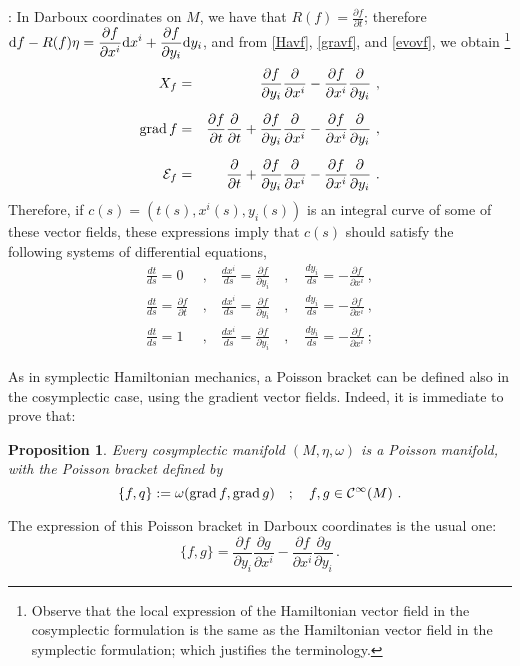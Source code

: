 \documentclass[12pt]{report}
\newtheorem{prop}[teor]{Proposition}
\def\beq{\begin{equation}}
\def\eeq{\end{equation}}
\def\bea{\begin{eqnarray}}
\def\eea{\end{eqnarray}}
\def\dst{\displaystyle}
\def\derpar#1#2{\frac{\partial{#1}}{\partial{#2}}}
\def\d{{\rm d}}
\begin{document}
:
In Darboux coordinates on $M$, we have that $\dst R(f)=\derpar{f}{t}$; therefore
$\dst \d f- R(f)\eta=\derpar{f}{x^i}\d x^i+\derpar{f}{y_i}\d y_i$, and from \eqref{Havf}, \eqref{gravf}, and \eqref{evovf},
we obtain
\footnote{
 Observe that the local expression of the Hamiltonian vector field in the cosymplectic formulation is the same as the Hamiltonian vector field in the symplectic formulation;
which justifies the terminology.}
\bea
    X_f &=& \frac{\partial f}{\partial y_ i}\frac{\partial}{\partial x^i}- \frac{\partial f}{\partial x^i}\frac{\partial}{\partial y_i}\ , \nonumber \\
\noalign{\medskip}
    {\rm grad}\,f &=& \frac{\partial f}{\partial t}\frac{\partial}{\partial t} + \frac{\partial f}{\partial y_ i}\frac{\partial}{\partial x^i}- \frac{\partial f}{\partial x^i}\frac{\partial}{\partial y_i}\ ,\nonumber \\
\noalign{\medskip}
    {\cal E}_f &=& \frac{\partial}{\partial t} + \frac{\partial f}{\partial y_ i}\frac{\partial}{\partial x^i}- \frac{\partial f}{\partial x^i}\frac{\partial}{\partial y_i}\ .
\label{evocoor1}
\eea
Therefore, if $c(s)=(t(s),x^i(s), y_i(s))$ is an integral curve of some of these vector fields, these expressions imply that $c(s)$ should satisfy the following systems of differential equations,
\bea
\frac{dt}{ds}=0 \ &,& \
\frac{dx^i}{ds}=\frac{\partial f}{\partial y_i} \quad ,\quad 
\frac{dy_i}{ds}= -\frac{\partial f}{\partial x^i}\ , \nonumber \\
\frac{dt}{ds}=\frac{\partial f}{\partial t} \ &,& \
\frac{dx^i}{ds}=\frac{\partial f}{\partial y_i} \quad ,\quad 
\frac{dy_i}{ds}= -\frac{\partial f}{\partial x^i}\ , \nonumber \\
\frac{dt}{ds}=1 \ &,& \
\frac{dx^i}{ds}=\frac{\partial f}{\partial y_i} \quad ,\quad 
\frac{dy_i}{ds}= -\frac{\partial f}{\partial x^i}\ ;
\label{evocoor2}
\eea

As in symplectic Hamiltonian mechanics, a Poisson bracket can be defined
also in the cosymplectic case, using the gradient vector fields. Indeed, it is immediate to prove that:

\begin{prop}
\label{4.6}
Every cosymplectic manifold $(M,\eta,\omega)$ is
a {\sl Poisson manifold}, with the {\sl Poisson bracket} defined by
\[
    \{f,q\}:=\omega({\rm grad}\, f,{\rm grad}\, g) \quad ; \quad 
f,g\in\mathcal{C}^\infty(M) \ .
\]
\end{prop}

The expression of this Poisson bracket in Darboux coordinates is the usual one:
\beq
\label{PBcoor}
    \{f,g\}= \frac{\partial f}{\partial y_i}\frac{\partial g}{\partial x^i}- \frac{\partial f}{\partial x^i}\frac{\partial g}{\partial y_i}\,.
\eeq
\end{document}
